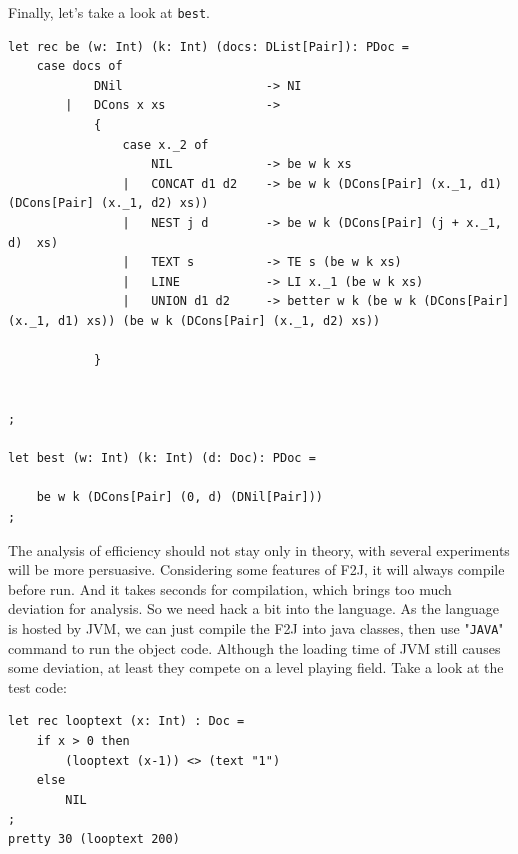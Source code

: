 Finally, let's take a look at \texttt{best}.


\begin{lstlisting}
let rec be (w: Int) (k: Int) (docs: DList[Pair]): PDoc =
    case docs of
            DNil                    -> NI
        |   DCons x xs              ->
            {
                case x._2 of
                    NIL             -> be w k xs
                |   CONCAT d1 d2    -> be w k (DCons[Pair] (x._1, d1) (DCons[Pair] (x._1, d2) xs))
                |   NEST j d        -> be w k (DCons[Pair] (j + x._1, d)  xs)
                |   TEXT s          -> TE s (be w k xs)
                |   LINE            -> LI x._1 (be w k xs)
                |   UNION d1 d2     -> better w k (be w k (DCons[Pair] (x._1, d1) xs)) (be w k (DCons[Pair] (x._1, d2) xs))

            }


;

let best (w: Int) (k: Int) (d: Doc): PDoc =

    be w k (DCons[Pair] (0, d) (DNil[Pair]))
;
\end{lstlisting}

The analysis of efficiency should not stay only in theory, with several experiments will be more persuasive. Considering some features of F2J, it will always compile before run. And it takes seconds for compilation, which brings too much deviation for analysis. So we need hack a bit into the language. As the language is hosted by JVM, we can just compile the F2J into java classes, then use "\texttt{JAVA}" command to run the object code. Although the loading time of JVM still causes some deviation, at least they compete on a level playing field. Take a look at the test code:
\begin{lstlisting}
let rec looptext (x: Int) : Doc =
    if x > 0 then
        (looptext (x-1)) <> (text "1")
    else
        NIL
;
pretty 30 (looptext 200)
\end{lstlisting}

